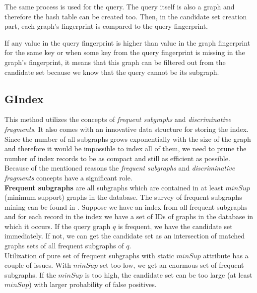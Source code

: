 The same process is used for the query. The query itself is also a graph and therefore the hash table can be created too. Then, in the candidate set creation part, each graph’s fingerprint is compared to the query fingerprint.

If any value in the query fingerprint is higher than value in the graph fingerprint for the same key or when some key from the query fingerprint is missing in the graph's fingerprint, it means that this graph can be filtered out from the candidate set because we know that the query cannot be its subgraph.

\subsection{GIndex}

This method utilizes the concepts of \textit{frequent subgraphs} and \textit{discriminative fragments}. It also comes with an innovative data structure for storing the index.\\

Since the number of all subgraphs grows exponentially with the size of the graph and therefore it would be impossible to index all of them, we need to prune the number of index records to be as compact and still as efficient as possible.\\

Because of the mentioned reasons the \textit{frequent subgraphs} and \textit{discriminative fragments} concepts have a significant role.\\

\textbf{Frequent subgraphs} are all subgraphs which are contained in at least \linebreak $ minSup $ (minimum support) graphs in the database. The survey of frequent subgraphs mining can be found in \cite{frequentGraphs}. Suppose we have an index from all frequent subgraphs and for each record in the index we have a set of IDs of graphs in the database in which it occurs. If the query graph $ q $ is frequent, we have the candidate set immediately. If not, we can get the candidate set as an intersection of matched graphs sets of all frequent subgraphs of $ q $.\\

Utilization of pure set of frequent subgraphs with static $ minSup $ attribute has a couple of issues. With $ minSup $ set too low, we get an enormous set of frequent subgraphs. If the $ minSup $ is too high, the candidate set can be too large (at least $ minSup $) with larger probability of false positives.\\

